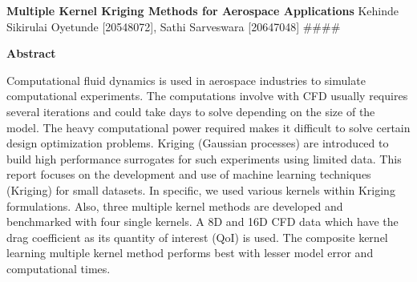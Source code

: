 \documentclass[11pt, letterpaper]{article}
\begin{document}
{\centering
\large
\begin{center}
	{\large\bf Multiple Kernel Kriging Methods for Aerospace Applications}
	\newline
	Kehinde Sikirulai Oyetunde [20548072],  Sathi Sarveswara [20647048] ####
\end{center}
}
\begin{small}
{\centering
\textbf{Abstract}\\
}
\vspace{0.2cm}
\begin{spacing}{1.2}
  \noindent 
        Computational fluid dynamics is used in aerospace industries to simulate computational experiments. The computations involve with CFD usually requires several iterations and could take days to solve depending on the size of the model. The heavy computational power required makes it difficult to solve certain design optimization problems. Kriging (Gaussian processes) are introduced to build high performance surrogates for such experiments using limited data. This report focuses on the development and use of machine learning techniques (Kriging) for small datasets. In specific, we used various kernels within Kriging formulations. Also, three multiple kernel methods are developed and benchmarked with four single kernels. A 8D and 16D CFD data which have the drag coefficient as its quantity of interest (QoI) is used. The composite kernel learning multiple kernel method performs best with lesser model error and computational times.
\end{spacing}

\end{small}
\end{document}
